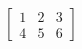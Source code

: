 \documentclass[preview]{standalone}
\begin{document}
\begin{align*}
\begin{bmatrix} 1 & 2 & 3 \\ 4 & 5 & 6 \end{bmatrix}
\end{align*}
\end{document}
